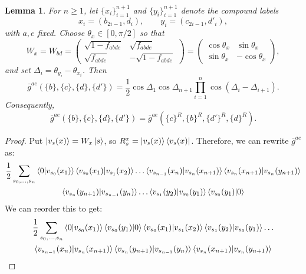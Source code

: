 \documentclass[aps,floatfix,10pt,amssymb,amsfont,amsmath,superscriptaddress,float,nofootinbib,longbibliography,nobalancelastpage,twocolumn]{revtex4-2}
\newtheorem{lemma}{Lemma}
\begin{document}
\begin{widetext}
\begin{multline}
     \label{eq:relabelline}
\end{multline}
\begin{lemma}
\label{lemma:summed-history-reversal}
For $n\geq1$, let $\{x_i\}_{i=1}^{n+1}$ and $\{y_i\}_{i=1}^{n+1}$ denote
the compound labels
\begin{equation*}
    x_i=(b_{2i-1},d_i),\qquad y_i=(c_{2i-1},d'_i),
\end{equation*}
with $a,e$ fixed.  Choose $\theta_x\in[0,\pi/2]$ so that
\begin{equation*}
    W_x=W_{bd}=\begin{pmatrix}
                \sqrt{1 - f_{abde}} & \sqrt{f_{abde}}\\
       \sqrt{f_{abde}} & -\sqrt{1 - f_{abde}}
    \end{pmatrix}= \begin{pmatrix}\cos\theta_x&\sin\theta_x\\
    \sin\theta_x&-\cos\theta_x\end{pmatrix},
\end{equation*}
and set $\Delta_i=\theta_{y_i}-\theta_{x_i}$.  Then
\begin{equation}
    \bar g^{ae}(\{b\},\{c\},\{d\},\{d'\})
    =\frac12\cos\Delta_1\cos\Delta_{n+1}
      \prod_{i=1}^{n}\cos(\Delta_i-\Delta_{i+1}).
\end{equation}
Consequently,
\begin{equation}
    \bar g^{ae}(\{b\},\{c\},\{d\},\{d'\})
    =\bar g^{ae}(\{c\}^R,\{b\}^R,\{d'\}^R,\{d\}^R).
    \label{eq:PRR}
\end{equation}
\end{lemma}
\begin{proof}
Put $\ket{v_s(x)}=W_x\ket{s}$, so
$R_s^x=\ket{v_s(x)}\bra{v_s(x)}$. Therefore, we can rewrite $\bar g^{ae}$ as:
\begin{multline}
    \frac{1}{2}\sum_{s_0,\ldots,s_n} \braket{0|v_{s_0}(x_1)}\braket{v_{s_0}(x_1)|v_{s_1}(x_2)}\ldots \braket{v_{s_{n-1}}(x_n)|v_{s_n}(x_{n+1})}\braket{v_{s_n}(x_{n+1})|v_{s_n}(y_{n+1})}\\\braket{v_{s_n}(y_{n+1})|v_{s_{n-1}}(y_n)}\ldots\braket{v_{s_1}(y_2)|v_{s_0}(y_1)}\braket{v_{s_0}(y_1)|0}
\end{multline}
We can reorder this to get:
\begin{multline}
    \frac{1}{2}\sum_{s_0,\ldots,s_n} \braket{0|v_{s_0}(x_1)}\braket{v_{s_0}(y_1)|0}\braket{v_{s_0}(x_1)|v_{s_1}(x_2)}\braket{v_{s_1}(y_2)|v_{s_0}(y_1)}\ldots\\ \braket{v_{s_{n-1}}(x_{n})|v_{s_{n}}(x_{n+1})}\braket{v_{s_{n}}(y_{n+1})|v_{s_{n-1}}(y_{n})}\braket{v_{s_{n}}(x_{n+1})|v_{s_{n}}(y_{n+1})}

\end{multline}
\end{proof}
\end{widetext}
\end{document}
